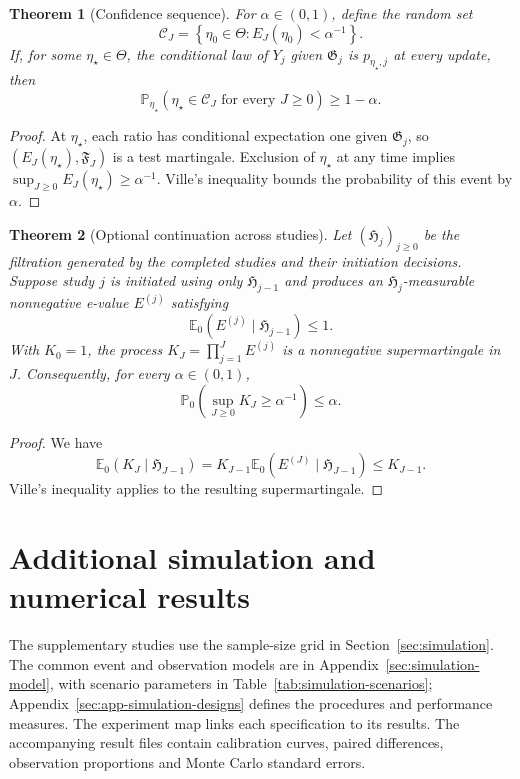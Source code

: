 \documentclass[12pt]{article}
\newtheorem{theorem}{Theorem}[section]
\theoremstyle{definition}
\theoremstyle{remark}
\begin{document}
\begin{theorem}[Confidence sequence]
\label{thm:confidence-sequence}
For $\alpha\in(0,1)$, define the random set
\[
 \mathcal C_J=\left\{\eta_0\in\Theta:E_J(\eta_0)<\alpha^{-1}\right\}.
\]
If, for some $\eta_\star\in\Theta$, the conditional law of $Y_j$ given $\mathfrak G_j$ is $p_{\eta_\star,j}$ at every update, then
\[
 \mathbb P_{\eta_\star}
 \left(\eta_\star\in \mathcal C_J\text{ for every }J\geq0\right)
 \geq1-\alpha.
\]
\end{theorem}

\begin{proof}
At $\eta_\star$, each ratio has conditional expectation one given $\mathfrak G_j$, so $(E_J(\eta_\star),\mathfrak F_J)$ is a test martingale. Exclusion of $\eta_\star$ at any time implies
$\sup_{J\geq0}E_J(\eta_\star)\geq\alpha^{-1}$. Ville's inequality bounds the probability of this event by $\alpha$.
\end{proof}

\begin{theorem}[Optional continuation across studies]
Let $(\mathfrak H_j)_{j\geq0}$ be the filtration generated by the completed studies and their initiation decisions. Suppose study $j$ is initiated using only $\mathfrak H_{j-1}$ and produces an $\mathfrak H_j$-measurable nonnegative e-value $E^{(j)}$ satisfying
\[
 \mathbb E_0\left(E^{(j)}\mid\mathfrak H_{j-1}\right)\leq1.
\]
With $K_0=1$, the process $K_J=\prod_{j=1}^J E^{(j)}$ is a nonnegative supermartingale in $J$. Consequently, for every $\alpha\in(0,1)$,
\[
 \mathbb P_0\left(\sup_{J\geq0}K_J\geq\alpha^{-1}\right)\leq\alpha.
\]
\end{theorem}

\begin{proof}
We have
\[
 \mathbb E_0\left(K_J\mid\mathfrak H_{J-1}\right)
 =K_{J-1}\mathbb E_0\left(E^{(J)}\mid\mathfrak H_{J-1}\right)
 \leq K_{J-1}.
\]
Ville's inequality applies to the resulting supermartingale.
\end{proof}

\section{Additional simulation and numerical results}
\label{app:simulations}

The supplementary studies use the sample-size grid in Section~\ref{sec:simulation}. The common event and observation models are in Appendix~\ref{sec:simulation-model}, with scenario parameters in Table~\ref{tab:simulation-scenarios}; Appendix~\ref{sec:app-simulation-designs} defines the procedures and performance measures. The experiment map links each specification to its results. The accompanying result files contain calibration curves, paired differences, observation proportions and Monte Carlo standard errors.
\end{document}
